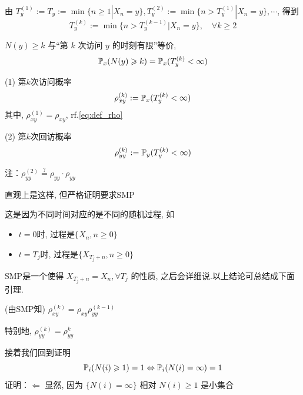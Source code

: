 \begin{definition}[第$k$次访问时间]
由 $T_y^{(1)}:=T_y:=\min\{n\geq 1|X_n=y\}, T_y^{(2)}:=\min\{n>T_y^{(1)}|X_n=y\}, \cdots$, 得到
\begin{equation}
T_y^{(k)}:=\min\{n>T_y^{(k-1)}|X_n=y\}, \quad \forall k\geq 2
\label{eq:revisit_k}
\end{equation}
\end{definition}

\begin{claim}
$N(y)\geq k$ 与“第 $k$ 次访问 $y$ 的时刻有限”等价, 
\begin{equation}
\mathbb{P}_x(N(y)\geqslant k)=\mathbb{P}_x(T_y^{(k)}<\infty)
\label{eq:time&count_k}
\end{equation}
\end{claim}

\begin{definition}
    (1) 第$k$次访问概率
    \begin{equation}
\rho_{xy}^{(k)}:=\mathbb{P}_x(T_y^{(k)}<\infty)
\label{eq:prob_visit_k}
\end{equation}
    其中, $\rho_{xy}^{(1)}=\rho_{xy}$, rf.\eqref{eq:def_rho}
    
    (2) 第$k$次回访概率
    \begin{equation}
    \rho_{yy}^{(k)}:=\mathbb{P}_y(T_y^{(k)}<\infty)
    \label{eq:prob_revisit_k}
\end{equation}
\end{definition}

注：$\rho_{yy}^{(2)}\overset{?}{=}\rho_{yy}\cdot \rho_{yy}$

直观上是这样, 但严格证明要求SMP

这是因为不同时间对应的是不同的随机过程, 如
\begin{itemize}
    \item $t=0$时, 过程是$\{X_n,n\geq 0\}$
    \item $t=T_j$时, 过程是$\{X_{T_j+n},n\geq 0\}$
\end{itemize}
SMP是一个使得 $X_{T_j+n}=X_n,\forall T_j$ 的性质, 之后会详细说.以上结论可总结成下面引理.

\begin{lemma}
    (由SMP知) $\rho_{xy}^{(k)}=\rho_{xy}\rho_{yy}^{(k-1)}$

    特别地, $\rho_{yy}^{(k)}=\rho_{yy}^k$
\end{lemma}

接着我们回到证明
\begin{equation}
\mathbb{P}_i(N(i)\geqslant 1)=1 \Leftrightarrow \mathbb{P}_i(N(i)=\infty)=1
\label{eq:equiv_count}
\end{equation}
证明：$\Leftarrow$ 显然, 因为 $\{N(i)=\infty\}$ 相对 $N(i)\geq 1$ 是小集合

